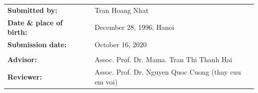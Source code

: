 \vspace{3.0cm}
\begin{center}
\small
\renewcommand{\arraystretch}{1.5} 
\begin{tabular}{lll}
    \textbf{Submitted by:} & & Tran Hoang Nhat\\
    \textbf{Date \& place of birth:} & & December 28, 1996, Hanoi\\
    \textbf{Submission date:} & & October 16, 2020 \\
    & & \\
    \textbf{Advisor:} & & Assoc. Prof. Dr. Mama. Tran Thi Thanh Hai \\
    \textbf{Reviewer:} & & Assoc. Prof. Dr. Nguyen Quoc Cuong (thay cuu em voi) \\
\end{tabular}
\end{center}
